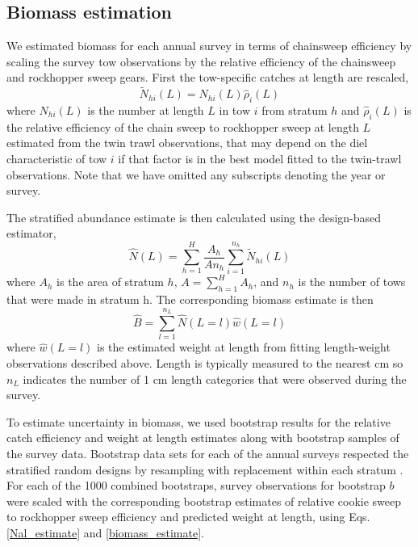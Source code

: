 \documentclass[12pt,letterpaper, leqno]{article}
\begin{document}
\subsection*{Biomass estimation}

We estimated biomass for each annual survey in terms of chainsweep efficiency by scaling the survey tow observations by the relative efficiency of the chainsweep and rockhopper sweep gears. First the tow-specific catches at length are rescaled,
\begin{equation}\label{nal}
\widetilde N_{hi}\left(L\right) = N_{hi}\left(L\right)\widehat \rho_i\left(L\right)
\end{equation}
where $N_{hi}(L)$ is the number at length $L$ in tow $i$ from stratum $h$ and $\widehat \rho_i\left(L\right)$ is the relative efficiency of the chain sweep to rockhopper sweep at length $L$ estimated from the twin trawl observations, that may depend on the diel characteristic of tow $i$ if that factor is in the best model fitted to the twin-trawl observations. Note that we have omitted any subscripts denoting the year or survey. 

The stratified abundance estimate is then calculated using the design-based estimator, 
\begin{equation}\label{Nal_estimate}
 \widehat N(L) = \sum^H_{h=1} \frac{A_h}{An_h}\sum^{n_h}_{i=1} \widetilde N_{hi}(L)
\end{equation}
where $A_h$ is the area of stratum $h$, $A=\sum^H_{h=1} A_h$, and $n_h$ is the number of tows that were made in stratum h. The corresponding biomass estimate is then
\begin{equation}\label{biomass_estimate}
 \widehat B = \sum^{n_L}_{l=1} \widehat N(L = l) \widehat w(L=l)
\end{equation}
where $\widehat w(L=l)$ is the estimated weight at length from fitting length-weight observations described above. Length is typically measured to the nearest cm so $n_L$ indicates the number of 1 cm length categories that were observed during the survey. 

To estimate uncertainty in biomass, we used bootstrap results for the relative catch efficiency and weight at length estimates along with bootstrap samples of the survey data.  Bootstrap data sets for each of the annual surveys respected the stratified random designs by resampling with replacement within each stratum \citep{smith97}. For each of the 1000 combined bootstraps, survey observations for bootstrap $b$ were scaled with the corresponding bootstrap estimates of relative cookie sweep to rockhopper sweep efficiency and predicted weight at length, using Eqs. \ref{Nal_estimate} and \ref{biomass_estimate}.
\end{document}
